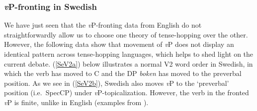 \subsubsection{\textit{v}P-fronting in Swedish}

\noindent
We have just seen that the \textit{v}P-fronting data from English do not straightforwardly allow us to choose one theory of tense-hopping over the other. However, the following data show that movement of \textit{v}P does not display an identical pattern across tense-hopping languages, which helps to shed light on the current debate. (\ref{SeV2a}) below illustrates a normal V2 word order in Swedish, in which the verb has moved to C and the DP {\it boken} has moved to the preverbal position. As we see in (\ref{SeV2b}), Swedish also moves \textit{v}P to the `preverbal' position (i.e.\ SpecCP) under \textit{v}P-topicalization. However, the verb in the fronted \textit{v}P is finite, unlike in English (examples from ).

